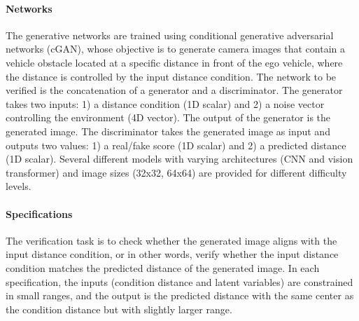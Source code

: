 \documentclass[oneside,11pt,dvipsnames]{book}
\numberwithin{equation}{section}
\theoremstyle{definition}
\theoremstyle{remark}
\begin{document}
\paragraph*{Networks}
The generative networks are trained using conditional generative adversarial networks (cGAN), whose objective is to generate camera images that contain a vehicle obstacle located at a specific distance in front of the ego vehicle, where the distance is controlled by the input distance condition.
The network to be verified is the concatenation of a generator and a discriminator.  The generator takes two inputs: 1) a distance condition (1D scalar) and 2) a noise vector controlling the environment (4D vector). The output of the generator is the generated image. The discriminator takes the generated image as input and outputs two values: 1) a real/fake score (1D scalar) and 2) a predicted distance (1D scalar).
Several different models with varying architectures (CNN and vision transformer) and image sizes (32x32, 64x64) are provided for different difficulty levels.
\paragraph*{Specifications}
The verification task is to check whether the generated image aligns with the input distance condition, or in other words, verify whether the input distance condition matches the predicted distance of the generated image.
In each specification, the inputs (condition distance and latent variables) are constrained in small ranges, and the output is the predicted distance with the same center as the condition distance but with slightly larger range.


\end{document}
